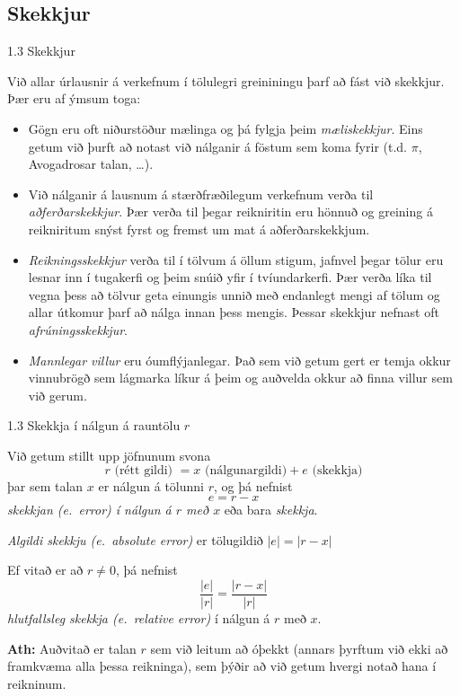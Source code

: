 \subsection{Skekkjur}
\begin{frame}{1.3 Skekkjur} 

Við allar úrlausnir á verkefnum í tölulegri greininingu 
þarf  að fást við skekkjur. \pause 
Þær eru af ýmsum toga: \pause


\begin{itemize} 
\item Gögn eru oft niðurstöður
mælinga og þá fylgja þeim {\it mæliskekkjur}. Eins getum við þurft 
að notast við nálganir á föstum sem koma fyrir (t.d. $\pi$, Avogadrosar
talan, \ldots).\pause
\item Við nálganir á lausnum á
stærðfræðilegum verkefnum verða til {\it aðferðarskekkjur}.
Þær verða til þegar reikniritin eru hönnuð og
greining á reikniritum snýst fyrst og fremst um mat á 
aðferðarskekkjum.\pause
\item  {\it Reikningsskekkjur} verða til í tölvum á öllum
stigum, jafnvel þegar tölur eru lesnar inn í tugakerfi og þeim snúið
yfir í tvíundarkerfi. Þær verða líka til vegna þess að tölvur geta
einungis unnið með endanlegt mengi af tölum og allar útkomur þarf að
nálga innan þess mengis.  Þessar skekkjur nefnast oft {\it
  afrúningsskekkjur}.  \pause
\item {\it Mannlegar villur} eru óumflýjanlegar. Það sem við getum gert
er temja okkur vinnubrögð sem lágmarka líkur á þeim og auðvelda okkur að
finna villur sem við gerum.
\end{itemize} 
\end{frame}
%
%
\begin{frame}{1.3 Skekkja í nálgun á rauntölu $r$} 

Við getum stillt upp jöfnunum svona
\begin{equation*}
	r \text{ (rétt gildi) } = x\text{ (nálgunargildi)} + 
	e \text{ (skekkja)}
\end{equation*} \pause
þar sem talan $x$ er nálgun á tölunni $r$, og þá nefnist 
\begin{equation*}
	e=r-x 
\end{equation*}
{\it skekkjan \emph{(e.~error)} í nálgun á $r$ með $x$} eða bara {\it skekkja}.
\pause

{\it Algildi skekkju  \emph{(e.~absolute error)}} er tölugildið 
	$|e|=|r-x|$
\pause

Ef vitað er að $r\neq 0$, þá nefnist 
\begin{equation*}
	\dfrac{|e|}{|r|}=\dfrac{|r-x|}{|r|}
\end{equation*}
{\it hlutfallsleg skekkja \emph{(e.~relative error)}} í nálgun á $r$ með $x$.
\pause

\smallskip
 \textbf{Ath:} Auðvitað er talan $r$ sem við leitum að óþekkt 
 (annars þyrftum við ekki að framkvæma alla þessa reikninga), sem þýðir 
 að við getum hvergi notað hana í reikninum.
\end{frame}


